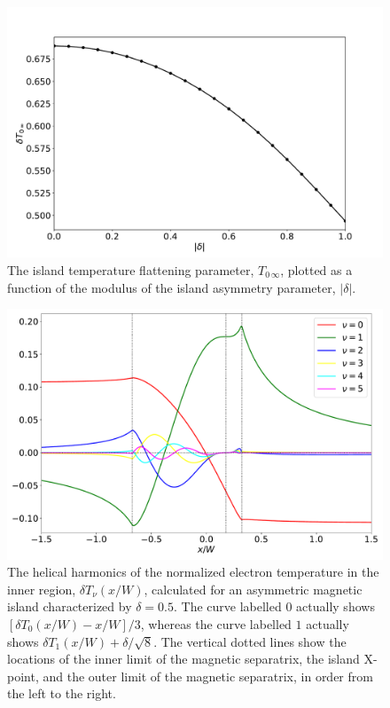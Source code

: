 \documentclass{iopjournal}
\begin{document}
\begin{figure}
\centerline{\includegraphics[width=\textwidth]{Fig5.pdf}}
\caption{The island temperature flattening parameter, $T_{0\,\infty}$, plotted as a function of the modulus of the island asymmetry parameter, $|\delta|$.  \label{fig3}}
\end{figure}

\begin{figure}
\centerline{\includegraphics[width=\textwidth]{Fig6.pdf}}
\caption{The helical harmonics of the normalized electron temperature  in the inner region, $\delta T_\nu(x/W)$, calculated for an asymmetric
magnetic island characterized by $\delta=0.5$.  The curve labelled $0$ actually shows $[\delta T_0(x/W)-x/W]/3$, whereas the
curve labelled  $1$ actually
shows $\delta T_1(x/W) +  \delta/\sqrt{8}$. The vertical dotted lines show the locations of the inner limit of the magnetic separatrix,
the island X-point, and the outer limit of the magnetic separatrix, in order from the left to the right.\label{fig4}}
\end{figure}
\end{document}
